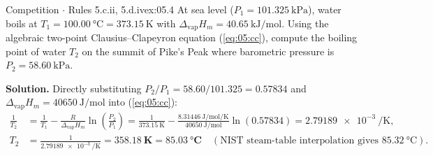 \begin{workedexample}{Competition $\cdot$ Rules 5.c.ii, 5.d.iv}{ex:05.4}
At sea level ($P_1 = \SI{101.325}{\kilo\pascal}$), water boils at $T_1 = \SI{100.00}{\celsius} = \SI{373.15}{\kelvin}$ with $\Delta_{\mathrm{vap}}H_m = \SI{40.65}{\kilo\joule\per\mole}$. Using the algebraic two-point Clausius--Clapeyron equation (\ref{eq:05:cc}), compute the boiling point of water $T_2$ on the summit of Pike's Peak where barometric pressure is $P_2 = \SI{58.60}{\kilo\pascal}$.

\textbf{Solution.}
Directly substituting $P_2/P_1 = 58.60 / 101.325 = 0.57834$ and $\Delta_{\mathrm{vap}}H_m = \SI{40650}{\joule\per\mole}$ into (\ref{eq:05:cc}):
\begin{align*}
  \frac{1}{T_2} &= \frac{1}{T_1} - \frac{R}{\Delta_{\mathrm{vap}}H_m}\ln\!\left(\frac{P_2}{P_1}\right) = \frac{1}{\SI{373.15}{\kelvin}} - \frac{\SI{8.31446}{\joule\per\mole\per\kelvin}}{\SI{40650}{\joule\per\mole}}\ln(0.57834) = \SI{2.79189e-3}{\per\kelvin}, \\
  T_2 &= \frac{1}{\SI{2.79189e-3}{\per\kelvin}} = \mathbf{\SI{358.18}{\kelvin} = \SI{85.03}{\celsius}} \quad (\text{NIST steam-table interpolation gives } \SI{85.32}{\celsius}).
\end{align*}
\end{workedexample}

